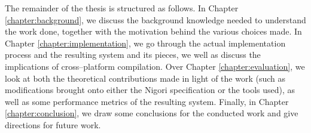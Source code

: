The remainder of the thesis is structured as follows.
In Chapter \ref{chapter:background}, we discuss the background knowledge needed to understand the work done, together with the motivation behind the various choices made.
In Chapter \ref{chapter:implementation}, we go through the actual implementation process and the resulting system and its pieces, we well as discuss the implications of cross--platform compilation.
Over Chapter \ref{chapter:evaluation}, we look at both the theoretical contributions made in light of the work (such as modifications brought onto either the Nigori specification or the tools used), as well as some performance metrics of the resulting system.
Finally, in Chapter \ref{chapter:conclusion}, we draw some conclusions for the conducted work and give directions for future work.
